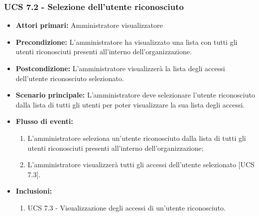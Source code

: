 \subsubsection{UCS 7.2 - Selezione dell'utente riconosciuto }
\begin{itemize}
\item \textbf{Attori primari:} Amministratore visualizzatore
\item \textbf{Precondizione:} L'amministratore ha visualizzato una lista con tutti gli utenti riconosciuti presenti all'interno dell'organizzazione.
\item \textbf{Postcondizione:} L'amministratore visualizzerà la lista degli accessi dell'utente riconosciuto selezionato.
\item \textbf{Scenario principale:} L'amministratore deve selezionare l'utente riconosciuto dalla lista di tutti gli utenti per poter visualizzare la sua lista degli accessi.
\item \textbf{Flusso di eventi:} 
	\begin{enumerate}
		\item L'amministratore seleziona un'utente riconosciuto dalla lista di tutti gli utenti riconosciuti presenti all'interno dell'organizzazione;
		\item L'amministratore visualizzerà tutti gli accessi dell'utente selezionato [UCS 7.3].
	\end{enumerate}
	\item \textbf{Inclusioni:}
	\begin{enumerate}
		\item UCS 7.3 - Visualizzazione degli accessi di un'utente riconosciuto.
	\end{enumerate}
\end{itemize}

